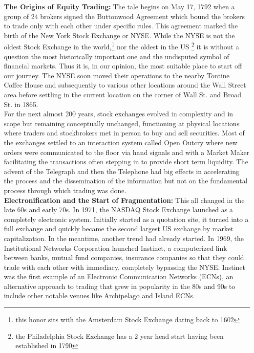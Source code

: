 \noindent\textbf{The Origins of Equity Trading:} The tale begins on May 17, 1792 when a group of 24 brokers signed the Buttonwood Agreement which bound the brokers to trade only with each other under specific rules. This agreement marked the birth of the New York Stock Exchange or NYSE. While the NYSE is not the oldest Stock Exchange in the world,\footnote{this honor sits with the Amsterdam Stock Exchange dating back to 1602} nor the oldest in the US \footnote{the Philadelphia Stock Exchange has a 2 year head start having been established in 1790} it is without a question the most historically important one and the undisputed symbol of financial markets. Thus it is, in our opinion, the most suitable place to start off our journey. The NYSE soon moved their operations to the nearby Tontine Coffee House and subsequently to various other locations around the Wall Street area before settling in the current location on the corner of Wall St. and Broad St. in 1865. \\


For the next almost 200 years, stock exchanges evolved in complexity and in scope but remaining conceptually unchanged, functioning at physical locations where traders and stockbrokers met in person to buy and sell securities. Most of the exchanges settled to an interaction system called Open Outcry where new orders were communicated to the floor via hand signals and with a Market Maker facilitating the transactions often stepping in to provide short term liquidity. The advent of the Telegraph and then the Telephone had big effects in accelerating the process and the dissemination of the information but not on the fundamental process through which trading was done. \\


\noindent\textbf{Electronification and the Start of Fragmentation:} This all changed in the late 60s and early 70s. In 1971, the NASDAQ Stock Exchange launched as a completely electronic system. Initially started as a quotation site, it turned into a full exchange and  quickly became the second largest US exchange by market capitalization. In the meantime, another trend had already started. In 1969, the Institutional Networks Corporation launched Instinet, a computerized link between banks, mutual fund companies, insurance companies so that they could trade with each other with immediacy, completely bypassing the NYSE. Instinet was the first example of an Electronic Communication Networks (ECNs), an alternative approach to trading that grew in popularity in the 80s and 90s to include other notable venues like Archipelago and Island ECNs.



